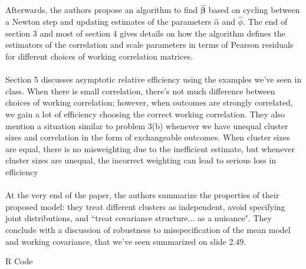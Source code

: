 \documentclass[11pt]{article}
\begin{document}
\begin{enumerate}
{	\\ \\
	Afterwards, the authors propose an algorithm to find $\widehat{\bm{\beta}}$ based on cycling between a Newton step and updating estimates of the parameters $\widehat{\alpha}$ and $\widehat{\phi}$. The end of section 3 and most of section 4 gives details on how the algorithm defines the estimators of the correlation and scale parameters in terms of Pearson residuals for different choices of working correlation matrices.
	\\ \\ Section 5 discusses asymptotic relative efficiency using the examples we've seen in class. When there is small correlation, there's not much difference between choices of working correlation; however, when outcomes are strongly correlated, we gain a lot of efficiency choosing the correct working correlation. They also mention a situation similar to problem 3(b) whenever we have unequal cluster sizes and correlation in the form of exchangeable outcomes. When cluster sizes are equal, there is no misweighting due to the inefficient estimate, but whenever cluster sizes are unequal, the incorrect weighting can lead to serious loss in efficiency
	\\ \\ At the very end of the paper, the authors summarize the properties of their proposed model: they treat different clusters as independent, avoid specifying joint distributions, and ``treat covariance structure... as a nuisance". They conclude with a discussion of robustness to misspecification of the mean model and working covariance, that we've seen summarized on slide 2.49.   \par}
\end{enumerate}
\newpage
R Code
\end{document}

